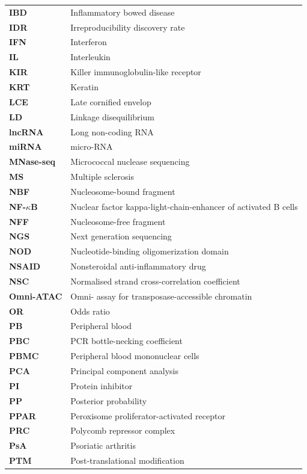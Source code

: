 \begin{longtable}{p{2.5cm}p{12.5cm}}
\textbf{IBD} & Inflammatory bowed disease\\
\textbf{IDR} & Irreproducibility discovery rate\\
\textbf{IFN} & Interferon\\
\textbf{IL} & Interleukin\\
\textbf{KIR} & Killer immunoglobulin-like receptor\\
\textbf{KRT} & Keratin\\
\textbf{LCE} & Late cornified envelop\\
\textbf{LD} & Linkage disequilibrium\\
\textbf{lncRNA} & Long non-coding RNA\\
\textbf{miRNA} & micro-RNA\\
\textbf{MNase-seq} & Micrococcal nuclease sequencing \\
\textbf{MS} & Multiple sclerosis\\
\textbf{NBF} & Nucleosome-bound fragment\\
\textbf{NF-$\kappa$B} & Nuclear factor kappa-light-chain-enhancer of activated B cells \\
\textbf{NFF} & Nucleosome-free fragment\\
\textbf{NGS} & Next generation sequencing\\
\textbf{NOD} & Nucleotide-binding oligomerization domain \\
\textbf{NSAID} & Nonsteroidal anti-inflammatory drug \\
\textbf{NSC}   & Normalised strand cross-correlation coefficient \\
\textbf{Omni-ATAC} & Omni- assay for transposase-accessible chromatin\\
\textbf{OR} & Odds ratio \\
\textbf{PB} & Peripheral blood \\
\textbf{PBC} & PCR bottle-necking coefficient\\
\textbf{PBMC} & Peripheral blood mononuclear cells \\
\textbf{PCA} & Principal component analysis  \\
\textbf{PI} & Protein inhibitor \\
\textbf{PP} & Posterior probability\\
\textbf{PPAR} & Peroxisome proliferator-activated receptor \\
\textbf{PRC} & Polycomb repressor complex\\
\textbf{PsA}  &Psoriatic arthritis  \\
\textbf{PTM} & Post-translational modification\\

\end{longtable}
